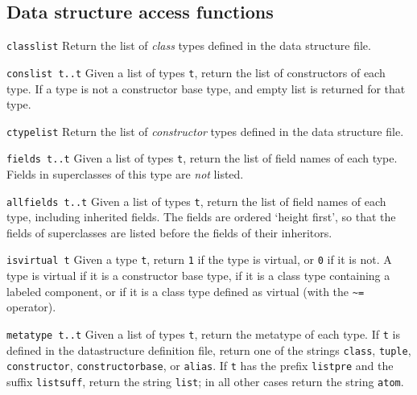 \subsection{Data structure access functions}
\begin{desctab}
\item[\texttt{classlist}]
Return the list of \emph{class} types defined in the data structure file.

\item[\texttt{conslist t..t}]
Given a list of types \verb't', return the list of constructors of
each type.  If a type is not a constructor base type, and empty list
is returned for that type.

\item[\texttt{ctypelist}]
Return the list of \emph{constructor} types defined in the data structure file.

\item[\texttt{fields t..t}]
Given a list of types \texttt{t}, return the list of field names of each type.
Fields in superclasses of this type are \emph{not} listed.

\item[\texttt{allfields t..t}]
Given a list of types \texttt{t}, return the list of field names of each type,
including inherited fields.
The fields are ordered `height first', so that the fields of
superclasses are listed before the fields of their inheritors.

\item[\texttt{isvirtual t}]
Given a type \texttt{t}, return \texttt{1} if the type is virtual, or
\texttt{0} if it is not. A type is virtual if it is a constructor base
type, if it is a class type containing a labeled component, or if it
is a class type defined as virtual (with the \verb'~=' operator).

\item[\texttt{metatype t..t}]
Given a list of types \texttt{t}, return the metatype of each type.
If \texttt{t} is defined in the datastructure definition file,
return one of the strings \texttt{class}, \texttt{tuple},
\texttt{constructor}, \texttt{constructorbase}, or \texttt{alias}.
If \texttt{t} has the prefix \texttt{listpre} and the suffix
\texttt{listsuff}, return the string \texttt{list}; in all other
cases return the string \texttt{atom}.


\end{desctab}
